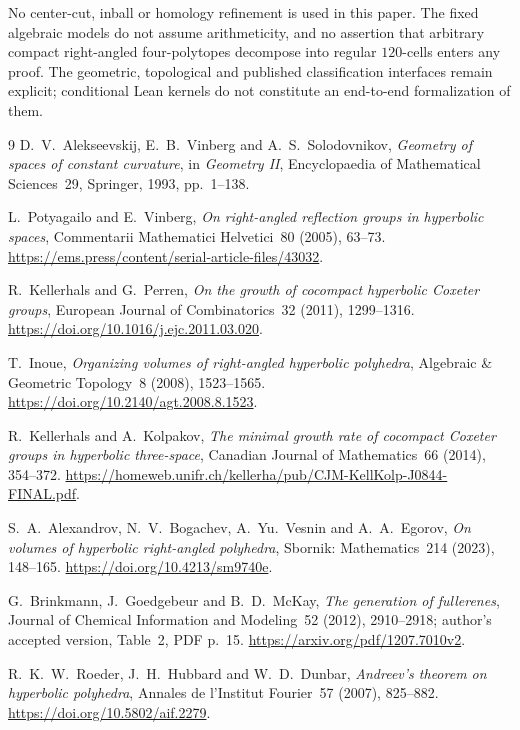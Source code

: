 \documentclass[11pt]{article}
\theoremstyle{remark}
\begin{document}
No center-cut, inball or homology refinement is used in this paper.
The fixed algebraic models do not assume arithmeticity, and no assertion
that arbitrary compact right-angled four-polytopes decompose into regular
$120$-cells enters any proof. The geometric, topological and published
classification interfaces remain explicit; conditional Lean kernels do
not constitute an end-to-end formalization of them.
\begin{thebibliography}{9}
D.~V.~Alekseevskij, E.~B.~Vinberg and A.~S.~Solodovnikov,
\emph{Geometry of spaces of constant curvature}, in
\emph{Geometry II}, Encyclopaedia of Mathematical Sciences~29,
Springer, 1993, pp.~1--138.

L.~Potyagailo and E.~Vinberg,
\emph{On right-angled reflection groups in hyperbolic spaces},
Commentarii Mathematici Helvetici~80 (2005), 63--73.
\url{https://ems.press/content/serial-article-files/43032}.

R.~Kellerhals and G.~Perren,
\emph{On the growth of cocompact hyperbolic Coxeter groups},
European Journal of Combinatorics~32 (2011), 1299--1316.
\url{https://doi.org/10.1016/j.ejc.2011.03.020}.

T.~Inoue, \emph{Organizing volumes of right-angled hyperbolic polyhedra},
Algebraic \& Geometric Topology~8 (2008), 1523--1565.
\url{https://doi.org/10.2140/agt.2008.8.1523}.

R.~Kellerhals and A.~Kolpakov,
\emph{The minimal growth rate of cocompact Coxeter groups in hyperbolic
three-space}, Canadian Journal of Mathematics~66 (2014), 354--372.
\url{https://homeweb.unifr.ch/kellerha/pub/CJM-KellKolp-J0844-FINAL.pdf}.

S.~A.~Alexandrov, N.~V.~Bogachev, A.~Yu.~Vesnin and A.~A.~Egorov,
\emph{On volumes of hyperbolic right-angled polyhedra},
Sbornik: Mathematics~214 (2023), 148--165.
\url{https://doi.org/10.4213/sm9740e}.

G.~Brinkmann, J.~Goedgebeur and B.~D.~McKay,
\emph{The generation of fullerenes}, Journal of Chemical Information
and Modeling~52 (2012), 2910--2918; author's accepted version,
Table~2, PDF p.~15.
\url{https://arxiv.org/pdf/1207.7010v2}.

R.~K.~W.~Roeder, J.~H.~Hubbard and W.~D.~Dunbar,
\emph{Andreev's theorem on hyperbolic polyhedra},
Annales de l'Institut Fourier~57 (2007), 825--882.
\url{https://doi.org/10.5802/aif.2279}.
\end{thebibliography}
\end{document}

